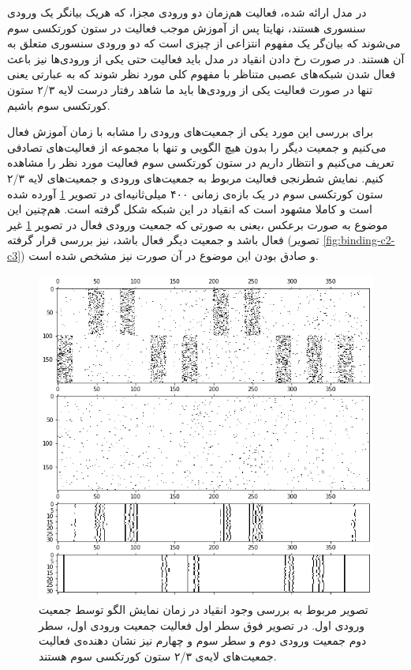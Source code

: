 \documentclass[12pt]{report}
\begin{document}
	در مدل ارائه شده، فعالیت هم‌زمان دو ورودی مجزا، که هریک بیانگر یک ورودی سنسوری هستند، نهایتا پس از آموزش موجب فعالیت در ستون کورتکسی سوم می‌شوند که بیان‌گر یک مفهوم انتزاعی از چیزی است که دو ورودی سنسوری متعلق به آن هستند. در صورت رخ دادن انقیاد در مدل باید فعالیت حتی یکی از ورودی‌ها نیز باعث فعال شدن شبکه‌های عصبی متناظر با مفهوم کلی مورد نظر شوند که به عبارتی یعنی تنها در صورت فعالیت یکی از ورودی‌ها باید ما شاهد رفتار درست لایه ۲/۳ ستون کورتکسی سوم باشیم.
	
	برای بررسی این مورد یکی از جمعیت‌های ورودی را مشابه با زمان آموزش فعال می‌کنیم و جمعیت دیگر را بدون هیچ الگویی و تنها با مجموعه از فعالیت‌های تصادفی تعریف می‌کنیم و انتظار داریم در ستون کورتکسی سوم فعالیت مورد نظر را مشاهده کنیم. نمایش شطرنجی فعالیت مربوط به جمعیت‌های ورودی و جمعیت‌های لایه ۲/۳ ستون کورتکسی سوم در یک بازه‌ی زمانی ۴۰۰ میلی‌ثانیه‌ای در تصویر \ref{fig:binding-c1-c3} آورده شده است و کاملا مشهود است که انقیاد در این شبکه شکل گرفته است. هم‌چنین این موضوع به صورت برعکس ،یعنی به صورتی که جمعیت ورودی فعال در تصویر \ref{fig:binding-c1-c3} غیر فعال باشد و جمعیت دیگر فعال باشد، نیز بررسی قرار گرفته (تصویر \ref{fig:binding-c2-c3}) و صادق بودن این موضوع در آن صورت نیز مشخص شده است.
	
	\begin{figure}[H]
		\centering
		\includegraphics[width=1.0\linewidth]{binding-c1-c3.png}
		\caption[NS]{
			تصویر مربوط به بررسی وجود انقیاد در زمان نمایش الگو توسط جمعیت ورودی اول. در تصویر فوق سطر اول فعالیت جمعیت ورودی اول، سطر دوم جمعیت ورودی دوم و سطر سوم و چهارم نیز نشان دهنده‌ی فعالیت جمعیت‌های لایه‌ی ۲/۳ ستون کورتکسی سوم هستند.
		}
		\label{fig:binding-c1-c3} 
	\end{figure}
\end{document}
